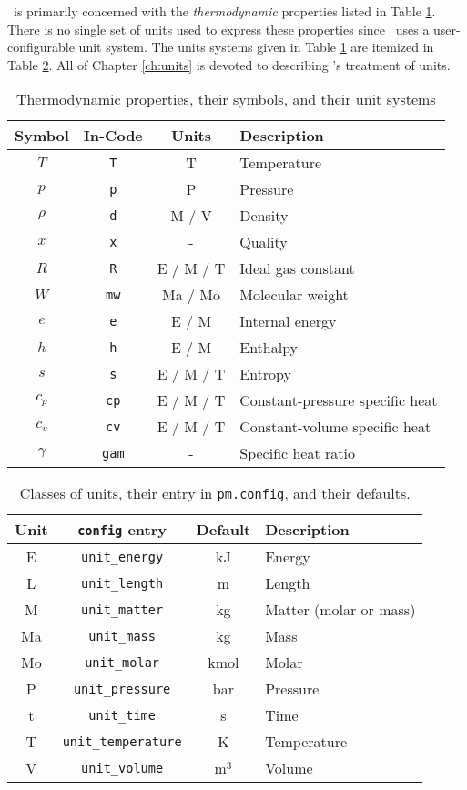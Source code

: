 \PM\ is primarily concerned with the \emph{thermodynamic} properties listed in Table \ref{tab:properties}.  There is no single set of units used to express these properties since \PM\ uses a user-configurable unit system.  The units systems given in Table \ref{tab:properties} are itemized in Table \ref{tab:units}.  All of Chapter \ref{ch:units} is devoted to describing \PM's treatment of units.

\begin{table}
\centering
\caption{Thermodynamic properties, their symbols, and their unit systems}\label{tab:properties}
\begin{tabular}{cccl}
\hline
Symbol & In-Code & Units & Description\\
\hline
$T$ & \verb|T| & T & Temperature\\
$p$ & \verb|p| & P & Pressure\\
$\rho$ & \verb|d| & M / V & Density\\
$x$ & \verb|x| & - & Quality\\
\hline
$R$ & \verb|R| & E / M / T & Ideal gas constant\\
$W$ & \verb|mw| & Ma / Mo & Molecular weight\\
\hline
$e$ & \verb|e| & E / M & Internal energy\\
$h$ & \verb|h| & E / M & Enthalpy\\
$s$ & \verb|s| & E / M / T & Entropy\\
\hline
$c_p$ & \verb|cp| & E / M / T & Constant-pressure specific heat\\
$c_v$ & \verb|cv| & E / M / T & Constant-volume specific heat\\
$\gamma$ & \verb|gam| & - & Specific heat ratio\\
\hline
\end{tabular}
\end{table}

\begin{table}
\centering
\caption{Classes of units, their entry in \texttt{pm.config}, and their defaults.}\label{tab:units}
\begin{tabular}{|cccl|}
\hline
Unit & \verb|config| entry & Default & Description\\
\hline
E & \verb|unit_energy| & kJ & Energy\\
L & \verb|unit_length| & m & Length\\
M & \verb|unit_matter| & kg & Matter (molar or mass)\\
Ma & \verb|unit_mass| & kg & Mass\\
Mo & \verb|unit_molar| & kmol & Molar\\
P & \verb|unit_pressure| & bar & Pressure\\
t & \verb|unit_time| & s & Time\\
T & \verb|unit_temperature| & K & Temperature\\
V & \verb|unit_volume| & m$^3$ & Volume\\
\hline
\end{tabular}
\end{table}


